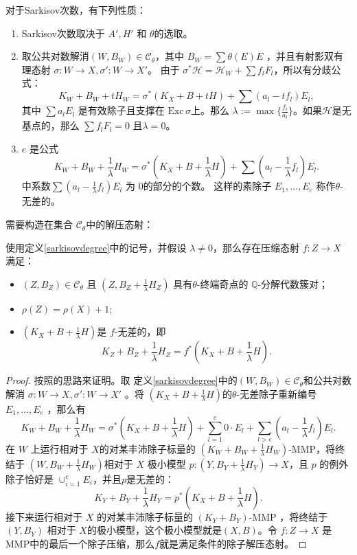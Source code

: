 \begin{remark}
  对于Sarkisov次数，有下列性质：
  \begin{enumerate}
    \item  Sarkisov次数取决于  $A', H'$ 和  $\theta$的选取。
    \item   取公共对数解消$ (W,B_W)\in \mathcal{C}_{\theta} $，其中 $ B_W=\sum \theta(E)E $ ，并且有射影双有理态射 $ \sigma:W\to X , \sigma':W\to X' $。 由于 $\sigma^*\mathcal{H}=\mathcal{H}_W+\sum f_{l}F_{l}$，所以有分歧公式：
          \[ K_W+B_W+tH_W=\sigma^*(K_X+B+tH)+\sum(a_l-tf_l)E_l ,\]
          其中 $ \sum a_l E_l $ 是有效除子且支撑在 $ \mathrm{Exc}\,\sigma $上。那么 $\lambda:=\max\{ \frac{f_l}{a_l}\}$。如果$ \mathcal{H} $是无基点的，那么 $ \sum f_lF_l=0 $ 且$\lambda=0  $。
    \item   $ e $ 是公式
          \[ K_W+B_W+\frac{1}{\lambda} H_W=\sigma^*(K_X+B+\frac{1}{\lambda} H)+\sum(a_l-\frac{1}{\lambda} f_l)E_l .\]
      中系数$\sum(a_l-\frac{1}{\lambda}f_l)E_l$ 为 $ 0 $的部分的个数。
          这样的素除子 $E_{1},\ldots, E_{e}$ 称作$\theta$-无差的。
  \end{enumerate}
\end{remark}
需要构造在集合 $\mathcal{C}_{\theta}$中的解压态射：
\begin{lemma}\label{thetaextraction}
  使用定义\ref{sarkisovdegree}中的记号，并假设 $\lambda \neq 0$，那么存在压缩态射  $f: Z\to X$ 满足：
  \begin{itemize}
    \item $(Z,B_{Z})\in \mathcal{C}_{\theta}$ 且 $(Z,B_{Z}+\frac{1}{\lambda}H_{Z})$ 具有$\theta$-终端奇点的 $\mathbb{Q}$-分解代数簇对；
    \item  $\rho(Z)=\rho(X)+1$;
    \item $(K_{X}+B+\frac{1}{\lambda}H)$是 $f$-无差的，即
          \[ K_{Z}+B_{Z}+\frac{1}{\lambda}H_{Z}=f^*(K_{X}+B+\frac{1}{\lambda}H) .\]
  \end{itemize}
\end{lemma}
\begin{proof}
  按照\cite[Proposition 1.6]{brunoLogSarkisovProgram1995}的思路来证明。取 定义\ref{sarkisovdegree}中的$ (W,B_{W})\in \mathcal{C}_{\theta}$和公共对数解消  $\sigma:W\to X,\sigma':W \to X'$ 。将 $(K_{X}+B+\frac{1}{\lambda}H)$的$\theta$-无差除子重新编号 $E_{1},\ldots ,E_{e}$ ，那么有
  \[ K_W+B_W+\frac{1}{\lambda} H_W=\sigma^*(K_X+B+\frac{1}{\lambda} H)+\sum_{l=1}^{e} 0\cdot E_{l}+\sum_{l>e}(a_l-\frac{1}{\lambda} f_l)E_l .\]
  在 $W$ 上运行相对于 $X$的对某丰沛除子标量的  $(K_{W}+B_{W}+\frac{1}{\lambda}H_{W})$-MMP，将终结于 $(W, B_{W}+\frac{1}{\lambda}H_{W})$相对于 $X$ 极小模型 $p:(Y, B_{Y}+\frac{1}{\lambda}H_{Y})\to X$，且 $p$ 的例外除子恰好是 $\cup_{i=1}^{e}E_{i}$，并且$p$是无差的：
  \[ K_{Y}+B_{Y}+\frac{1}{\lambda}H_{Y}=p^*(K_{X}+B+\frac{1}{\lambda}H) .\]
  接下来运行相对于 $X$ 的对某丰沛除子标量的  $(K_{Y}+B_{Y})$-MMP ，将终结于  $(Y,B_{Y})$ 相对于 $X$的极小模型，这个极小模型就是$(X,B)$。令 $f: Z\to X$ 是MMP中的最后一个除子压缩，那么$f$就是满足条件的除子解压态射。 \end{proof}

